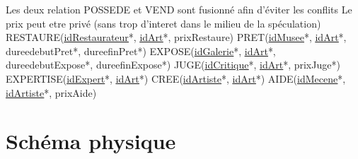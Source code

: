 \documentclass{article}
\begin{document}
Les deux relation POSSEDE et VEND sont fusionné afin d'éviter les conflits \newline
Le prix peut etre privé (sans trop d'interet dans le milieu de la spéculation) \newline
\\
RESTAURE(\underline{\underline{idRestaurateur}}*, \underline{\underline{idArt}}*, prixRestaure) \newline
PRET(\underline{\underline{idMusee}}*, \underline{\underline{idArt}}*, dureedebutPret*, dureefinPret*) \newline
EXPOSE(\underline{\underline{idGalerie}}*, \underline{\underline{idArt}}*, dureedebutExpose*, dureefinExpose*) \newline
JUGE(\underline{\underline{idCritique}}*, \underline{\underline{idArt}}*, prixJuge*) \newline
EXPERTISE(\underline{\underline{idExpert}}*, \underline{\underline{idArt}}*) \newline
CREE(\underline{\underline{idArtiste}}*, \underline{\underline{idArt}}*) \newline
AIDE(\underline{\underline{idMecene}}*, \underline{\underline{idArtiste}}*, prixAide) \newline


\clearpage


\section{Schéma physique}
\end{document}

